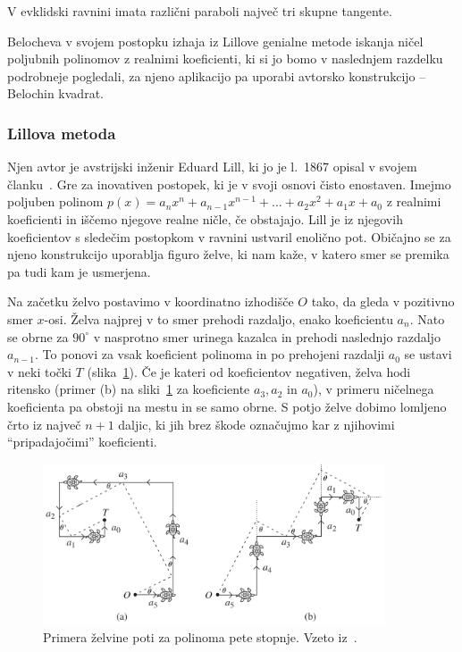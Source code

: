 \begin{posledica}
    V evklidski ravnini imata različni paraboli največ tri skupne tangente.
\end{posledica}

Belocheva v svojem postopku izhaja iz Lillove genialne metode iskanja ničel poljubnih polinomov z realnimi koeficienti, ki si jo bomo v naslednjem razdelku podrobneje pogledali, za njeno aplikacijo pa uporabi avtorsko konstrukcijo -- Belochin kvadrat.

\subsubsection*{Lillova metoda}

Njen avtor je avstrijski inženir Eduard Lill, ki jo je l.\ 1867 opisal v svojem članku~\cite{lill1867}. Gre za inovativen postopek, ki je v svoji osnovi čisto enostaven. Imejmo poljuben polinom $ p(x) = a_n x^n + a_{n-1} x^{n-1} + \ldots + a_2 x^2 + a_1 x + a_0 $ z realnimi koeficienti in iščemo njegove realne ničle, če obstajajo. Lill je iz njegovih koeficientov s sledečim postopkom v ravnini ustvaril enolično pot. Običajno se za njeno konstrukcijo uporablja figuro želve, ki nam kaže, v katero smer se premika pa tudi kam je usmerjena.

Na začetku želvo postavimo v koordinatno izhodišče $O$ tako, da gleda v pozitivno smer $x$-osi. Želva najprej v to smer prehodi razdaljo, enako koeficientu $a_n$. Nato se obrne za $90^\circ$ v nasprotno smer urinega kazalca in prehodi naslednjo razdaljo $a_{n-1}$. To ponovi za vsak koeficient polinoma in po prehojeni razdalji $a_0$ se ustavi v neki točki $T$ (slika~\ref{fig:primera_zelve}). Če je kateri od koeficientov negativen, želva hodi ritensko (primer (b) na sliki~\ref{fig:primera_zelve} za koeficiente $a_3, a_2$ in $a_0$), v primeru ničelnega koeficienta pa obstoji na mestu in se samo obrne. S potjo želve dobimo lomljeno črto iz največ $n+1$ daljic, ki jih brez škode označujmo kar z njihovimi ``pripadajočimi'' koeficienti.

\begin{figure}[h]
    \centering
    \includegraphics[width=0.9\textwidth]{images/kubična enačba/primera_zelvine_poti.png}
    \caption[Primera želvine poti]{Primera želvine poti za polinoma pete stopnje. Vzeto iz~\cite[str.\ 311]{hull2011}.}
    \label{fig:primera_zelve}
\end{figure}

